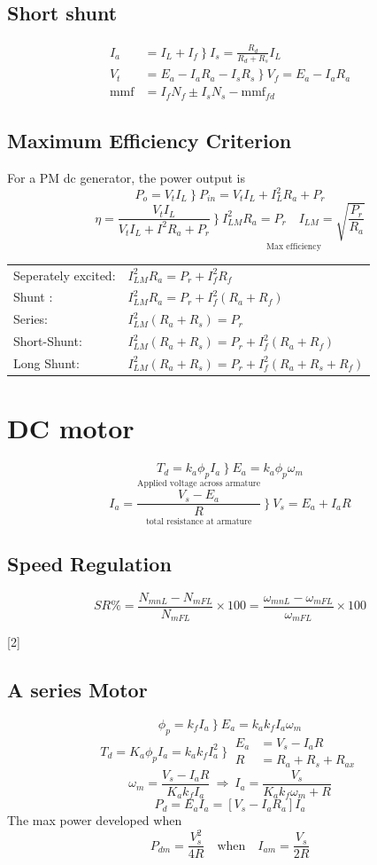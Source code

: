\documentclass[11pt,a4paper]{article}
\begin{document}
\subsection{Short shunt}
\begin{align*}
I_a&=I_L+I_f\ \rbrace\ I_s=\frac{R_d}{R_d+R_s}I_L\\
V_t&=E_a-I_aR_a-I_sR_s\ \rbrace\ V_f=E_a-I_aR_a\\
\mathrm{mmf}&=I_fN_f\pm I_sN_s-\mathrm{mmf}_{fd}
\end{align*}

\subsection{Maximum Efficiency Criterion}
\noindent For a PM dc generator, the power output is
\[ P_o=V_tI_L\ \rbrace\ P_{in}=V_tI_L+I_L^2R_a+P_r \]
\[ \eta=\frac{V_tI_L}{V_tI_L+I^2R_a+P_r}\ \rbrace\ \underset{\text{Max efficiency}}{I_{LM}^2R_a=P_r\quad I_{LM}=\sqrt{\frac{P_r}{R_a}}} \]
\begin{tabular}{@{}l l@{}}
Seperately excited: & $I_{LM}^2R_a=P_r+I_f^2R_f$\\
Shunt : & $I_{LM}^2R_a=P_r+I_f^2(R_a+R_f)$\\
Series: & $I_{LM}^2(R_a+R_s)=P_r$\\
Short-Shunt: & $I_{LM}^2(R_a+R_s)=P_r+I_f^2(R_a+R_f)$\\
Long Shunt: & $I_{LM}^2(R_a+R_s)=P_r+I_f^2(R_a+R_s+R_f)$
\end{tabular}

\section{DC motor}
\[ T_d=k_a\phi_pI_a\ \rbrace\ E_a=k_a\phi_p\omega_m \]
\[ I_a=\frac{\overset{\text{Applied voltage across armature}}{V_s-E_a}}{\underset{\text{total resistance at armature}}{R}}\ \rbrace\ V_s=E_a+I_aR \]

\subsection{Speed Regulation}
\[ SR\%=\frac{N_{mnL}-N_{mFL}}{N_{mFL}}\times100=\frac{\omega_{mnL}-\omega_{mFL}}{\omega_{mFL}}\times100 \]

[2]

\subsection{A series Motor}
\[ \phi_p=k_fI_a\ \rbrace\ E_a=k_ak_fI_a\omega_m \]
\[ T_d=K_a\phi_pI_a=k_ak_fI_a^2\ \rbrace\ \begin{aligned}E_a&=V_s-I_aR\\ R&=R_a+R_s+R_{ax}\end{aligned} \]
\[ \omega_m=\frac{V_s-I_aR}{K_ak_fI_a}\ \Rightarrow\ I_a=\frac{V_s}{K_ak_f\omega_m+R} \]
\[ P_d=E_aI_a=[V_s-I_aR_a]I_a \]
\noindent The max power developed when
\[ P_{dm}=\frac{V_s^2}{4R}\quad\text{when}\quad I_{am}=\frac{V_s}{2R} \]
\end{document}
